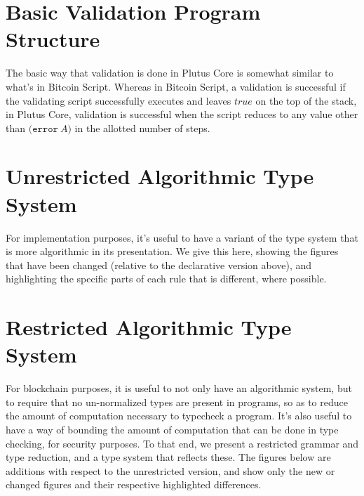 \documentclass[a4paper]{article}
\newcommand{\keyword}[1]{\texttt{#1}}
\newcommand{\construct}[1]{\texttt{(} #1 \texttt{)}}
\newcommand{\error}[1]{\construct{\keyword{error} ~ #1}}
\begin{document}
\section{Basic Validation Program Structure}

The basic way that validation is done in Plutus Core is somewhat
similar to what's in Bitcoin Script. Whereas in Bitcoin Script, a
validation is successful if the validating script successfully
executes and leaves $\textit{true}$ on the top of the stack, in Plutus
Core, validation is successful when the script reduces to any value
other than \(\error{A}\) in the allotted number of steps.




%

%

%


%



\section{Unrestricted Algorithmic Type System}

For implementation purposes, it's useful to have a variant of the type system that is more algorithmic in its presentation. We give this here, showing the figures that have been changed (relative to the declarative version above), and highlighting the specific parts of each rule that is different, where possible.





\section{Restricted Algorithmic Type System}

For blockchain purposes, it is useful to not only have an algorithmic system, but to require that no un-normalized types are present in programs, so as to reduce the amount of computation necessary to typecheck a program. It's also useful to have a way of bounding the amount of computation that can be done in type checking, for security purposes. To that end, we present a restricted grammar and type reduction, and a type system that reflects these. The figures below are additions with respect to the unrestricted version, and show only the new or changed figures and their respective highlighted differences.








\end{document}
